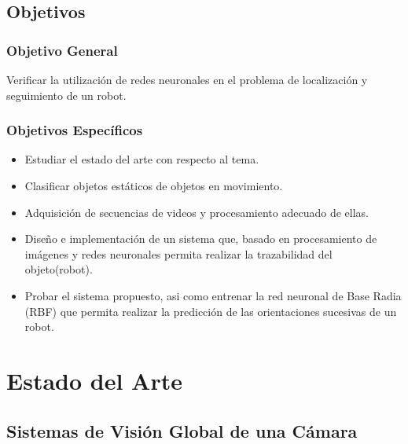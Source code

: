 \documentclass[conference]{IEEEtran}
\begin{document}
\subsection{Objetivos}
\subsubsection{Objetivo General}
Verificar la utilizaci\'on de redes neuronales en el problema de localizaci\'on y seguimiento de un robot.
\subsubsection{Objetivos Espec\'ificos}
\begin{itemize}
\item Estudiar el estado del arte con respecto al tema.
\item Clasificar objetos est\'aticos de objetos en movimiento.
\item Adquisici\'on de secuencias de videos y procesamiento adecuado de ellas.
\item Dise\~no e implementaci\'on de un sistema que, basado en procesamiento de im\'agenes y redes neuronales permita realizar la trazabilidad del objeto(robot).
\item Probar el sistema propuesto, asi como entrenar la red neuronal de Base Radia (RBF) que permita realizar la predicci\'on de las orientaciones sucesivas de un robot.
\end{itemize}



\section{Estado del Arte}
\subsection{\textbf{Sistemas de Visi\'on Global de una C\'amara}}
\end{document}
